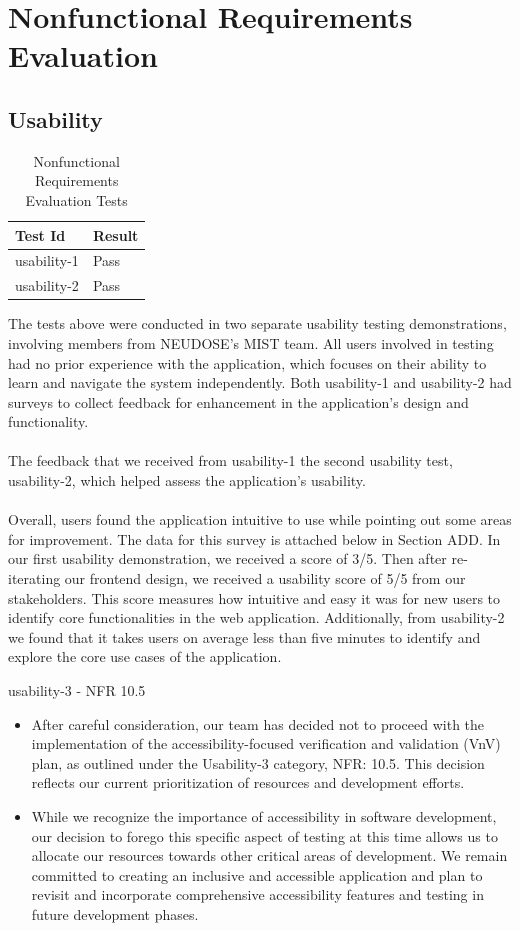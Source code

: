 \documentclass[12pt, titlepage]{article}
\begin{document}
\section{Nonfunctional Requirements Evaluation}

\subsection{Usability}

\begin{center}
\begin{longtable}{|p{4cm} | p{4cm}| }
\caption{Nonfunctional Requirements Evaluation Tests}
\hline
\textbf{Test Id} & \textbf{Result} \\
\hline
usability-1 & Pass \\
\hline
usability-2 & Pass \\
\hline

\end{longtable}
\end{center}
The tests above were conducted in two separate usability testing demonstrations, involving members from NEUDOSE's MIST team. All users involved in testing had no prior experience with the application, which focuses on their ability to learn and navigate the system independently. Both usability-1 and usability-2 had surveys to collect feedback for enhancement in the application’s design and functionality.
\\ \\
The feedback that we received from usability-1 the second
usability test, usability-2, which helped assess the application's usability.
\\ \\ 
Overall, users found the application intuitive to use while pointing out some areas for improvement. The data for this survey is attached below in Section ADD. In our first usability demonstration, we received a score of 3/5. Then after re-iterating our frontend design, we received a usability score of 5/5 from our stakeholders. This score measures how intuitive and easy it was for new users to identify core functionalities in the web application. Additionally, from usability-2 we found that it takes users on average less than five minutes to identify and explore the core use cases of the application.

usability-3 - NFR 10.5
\begin{itemize}
    \item After careful consideration, our team has decided not to proceed with the implementation of the accessibility-focused verification and validation (VnV) plan, as outlined under the Usability-3 category, NFR: 10.5. This decision reflects our current prioritization of resources and development efforts. 
    \item While we recognize the importance of accessibility in software development, our decision to forego this specific aspect of testing at this time allows us to allocate our resources towards other critical areas of development. We remain committed to creating an inclusive and accessible application and plan to revisit and incorporate comprehensive accessibility features and testing in future development phases. 
\end{itemize}
\end{document}
